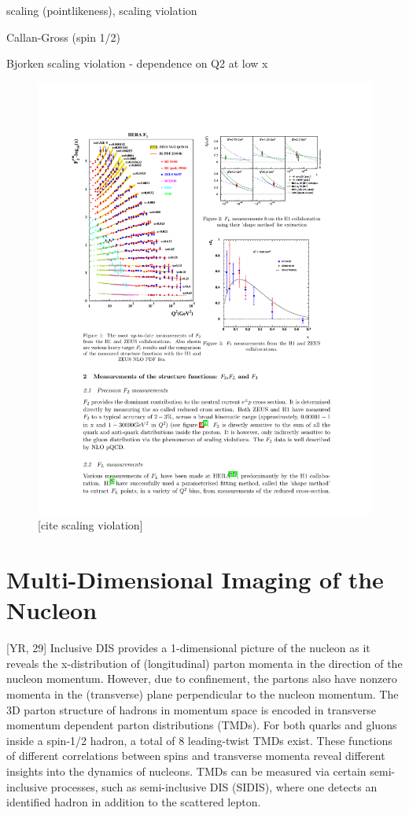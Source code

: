 scaling (pointlikeness), scaling violation

Callan-Gross (spin 1/2)

Bjorken scaling violation - dependence on Q2 at low x

\begin{figure}[H]
    \centering
    \includegraphics[width=.7\linewidth]{img/scaling_violation.pdf}
    \caption{[cite scaling violation]}
    \label{fig:physics:scaling_violation}
\end{figure}


\section{Multi-Dimensional Imaging of the Nucleon}


[YR, 29] Inclusive DIS provides a 1-dimensional picture of the nucleon as it reveals the x-distribution of (longitudinal) parton momenta in the direction of the nucleon momentum. However, due to confinement, the partons also have nonzero momenta in the (transverse) plane perpendicular to the nucleon momentum. The 3D parton structure of hadrons in momentum space is encoded in transverse momentum dependent parton distributions (TMDs). For both quarks and gluons inside a spin-1/2 hadron, a total of 8 leading-twist TMDs exist. These functions of different correlations between spins and transverse momenta reveal different insights into the dynamics of nucleons. TMDs can be measured via certain semi-inclusive processes, such as semi-inclusive DIS (SIDIS), where one detects an identified hadron in addition to the scattered lepton.

